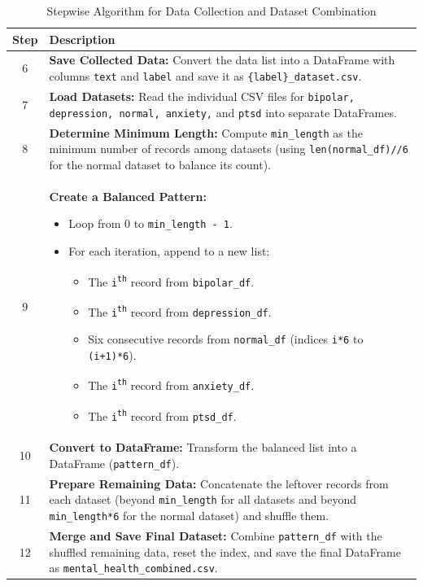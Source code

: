 \begin{table}[H]
    \centering
    \caption*{Stepwise Algorithm for Data Collection and Dataset Combination}
    \label{tab:algorithm}
    \begin{tabularx}{\textwidth}{|c|X|}
        \hline
        \textbf{Step} & \textbf{Description} \\
        \hline
        6 & \textbf{Save Collected Data:} Convert the data list into a DataFrame with columns \texttt{text} and \texttt{label} and save it as \texttt{\{label\}\_dataset.csv}. \\
        \hline
        7 & \textbf{Load Datasets:} Read the individual CSV files for \texttt{bipolar, depression, normal, anxiety,} and \texttt{ptsd} into separate DataFrames. \\
        \hline
        8 & \textbf{Determine Minimum Length:} Compute \texttt{min\_length} as the minimum number of records among datasets (using \texttt{len(normal\_df)//6} for the normal dataset to balance its count). \\
        \hline
        9 & \textbf{Create a Balanced Pattern:}
            \begin{itemize}[noitemsep, topsep=0pt]
                \item Loop from 0 to \texttt{min\_length - 1}.
                \item For each iteration, append to a new list:
                    \begin{itemize}[noitemsep, topsep=0pt]
                        \item The \texttt{i\textsuperscript{th}} record from \texttt{bipolar\_df}.
                        \item The \texttt{i\textsuperscript{th}} record from \texttt{depression\_df}.
                        \item Six consecutive records from \texttt{normal\_df} (indices \texttt{i*6} to \texttt{(i+1)*6}).
                        \item The \texttt{i\textsuperscript{th}} record from \texttt{anxiety\_df}.
                        \item The \texttt{i\textsuperscript{th}} record from \texttt{ptsd\_df}.
                    \end{itemize}
            \end{itemize} \\
        \hline
        10 & \textbf{Convert to DataFrame:} Transform the balanced list into a DataFrame (\texttt{pattern\_df}). \\
        \hline
        11 & \textbf{Prepare Remaining Data:} Concatenate the leftover records from each dataset (beyond \texttt{min\_length} for all datasets and beyond \texttt{min\_length*6} for the normal dataset) and shuffle them. \\
        \hline
        12 & \textbf{Merge and Save Final Dataset:} Combine \texttt{pattern\_df} with the shuffled remaining data, reset the index, and save the final DataFrame as \texttt{mental\_health\_combined.csv}. \\
        \hline
    \end{tabularx}
\end{table}

